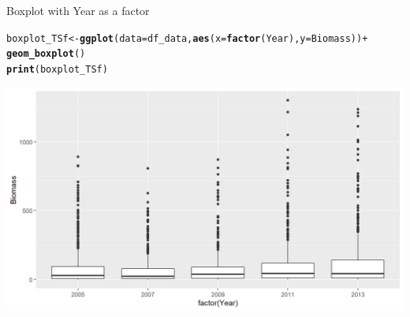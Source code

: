 \documentclass{beamer}\usepackage[]{graphicx}\usepackage[]{color}
\makeatletter
\newcommand{\hlopt}[1]{\textcolor[rgb]{0,0,0}{#1}}%
\newcommand{\hlstd}[1]{\textcolor[rgb]{0.345,0.345,0.345}{#1}}%
\newcommand{\hlkwb}[1]{\textcolor[rgb]{0.69,0.353,0.396}{#1}}%
\newcommand{\hlkwc}[1]{\textcolor[rgb]{0.333,0.667,0.333}{#1}}%
\newcommand{\hlkwd}[1]{\textcolor[rgb]{0.737,0.353,0.396}{\textbf{#1}}}%
\newenvironment{kframe}{%
 \def\at@end@of@kframe{}%
 \ifinner\ifhmode%
  \def\at@end@of@kframe{\end{minipage}}%
  \begin{minipage}{\columnwidth}%
 \fi\fi%
 \def\FrameCommand##1{\hskip\@totalleftmargin \hskip-\fboxsep
 \colorbox{shadecolor}{##1}\hskip-\fboxsep
     \hskip-\linewidth \hskip-\@totalleftmargin \hskip\columnwidth}%
 \MakeFramed {\advance\hsize-\width
   \@totalleftmargin\z@ \linewidth\hsize
   \@setminipage}}%
 {\par\unskip\endMakeFramed%
 \at@end@of@kframe}
\newenvironment{knitrout}{}{} %
\makeatother
\begin{document}
\begin{frame}[fragile]{Boxplot with Year as a factor}
\begin{knitrout}\footnotesize
{}\color{fgcolor}\begin{kframe}
\begin{alltt}
 \hlstd{boxplot_TSf} \hlkwb{<-} \hlkwd{ggplot}\hlstd{(}\hlkwc{data}\hlstd{=df_data,} \hlkwd{aes}\hlstd{(}\hlkwc{x}\hlstd{=}\hlkwd{factor}\hlstd{(Year),} \hlkwc{y}\hlstd{=Biomass))} \hlopt{+}
   \hlkwd{geom_boxplot}\hlstd{()}
 \hlkwd{print}\hlstd{(boxplot_TSf)}
\end{alltt}
\end{kframe}

{\centering \includegraphics[width=.9\linewidth]{figure/boxplot_TSf-1} 

}



\end{knitrout}
\end{frame}
\end{document}
